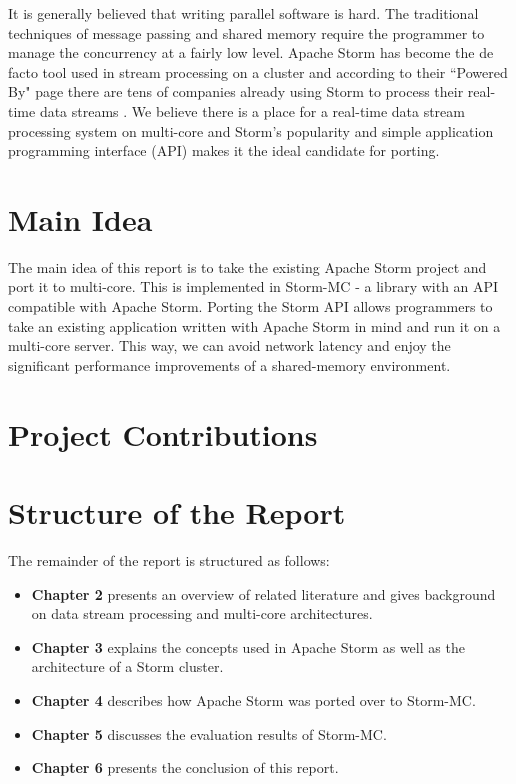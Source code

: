 It is generally believed that writing parallel software is hard. The traditional techniques of message passing and shared memory require the programmer to manage the concurrency at a fairly low level. Apache Storm has become the de facto tool used in stream processing on a cluster and according to their ``Powered By" page there are tens of companies already using Storm to process their real-time data streams \cite{PoweredBy}. We believe there is a place for a real-time data stream processing system on multi-core and Storm's popularity and simple application programming interface (API) makes it the ideal candidate for porting.

\section{Main Idea}

The main idea of this report is to take the existing Apache Storm project and port it to multi-core. This is implemented in Storm-MC - a library with an API compatible with Apache Storm. Porting the Storm API allows programmers to take an existing application written with Apache Storm in mind and run it on a multi-core server. This way, we can avoid network latency and enjoy the significant performance improvements of a shared-memory environment.

\section{Project Contributions}

\section{Structure of the Report}

The remainder of the report is structured as follows:

\begin{itemize}
	\item \textbf{Chapter 2} presents an overview of related literature and gives background on data stream processing and multi-core architectures.
	\item \textbf{Chapter 3} explains the concepts used in Apache Storm as well as the architecture of a Storm cluster.
	\item \textbf{Chapter 4} describes how Apache Storm was ported over to Storm-MC.
	\item \textbf{Chapter 5} discusses the evaluation results of Storm-MC.
	\item \textbf{Chapter 6} presents the conclusion of this report.
\end{itemize}
